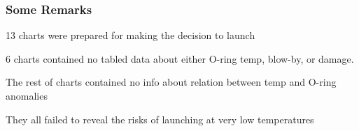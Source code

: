 \documentclass[12pt]{beamer}\usepackage[]{graphicx}\usepackage[]{color}
\begin{document}

\begin{frame}
\frametitle{}
\begin{center}

{\scriptsize {}}
\end{center}
\end{frame}


\begin{frame}
\frametitle{}
\begin{center}

{\scriptsize {}}
\end{center}
\end{frame}


\begin{frame}
\frametitle{}
\begin{center}

{\scriptsize {}}
\end{center}
\end{frame}


\begin{frame}
\frametitle{}
\begin{center}

{\scriptsize {}}
\end{center}
\end{frame}


\begin{frame}
\frametitle{Some Remarks}

\bbi
  \item 13 charts were prepared for making the decision to launch
  \item 6 charts contained no tabled data about either O-ring temp, blow-by, or damage.
  \item The rest of charts contained no info about relation between temp and O-ring anomalies
  \item They all failed to reveal the risks of launching at very low temperatures
\ei

\end{frame}
\end{document}
